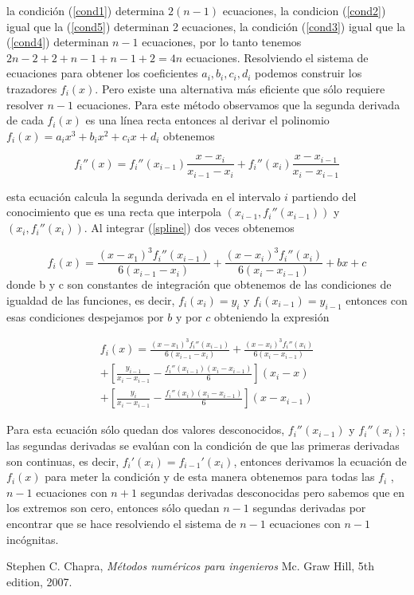 \documentclass[10pt,twocolumn]{article}
\begin{document}
la condici\'on (\ref{cond1}) determina $2(n-1)$ ecuaciones, la condicion (\ref{cond2}) igual que la (\ref{cond5}) determinan 2 ecuaciones, la 
condici\'on
(\ref{cond3}) igual que la 
(\ref{cond4}) determinan $n-1$ ecuaciones, por lo tanto tenemos $2n-2 + 2 + n-1 + n-1 + 2 = 4n$ ecuaciones. Resolviendo el sistema de ecuaciones para 
obtener los coeficientes $a_i,b_i,c_i,d_i$ podemos construir los trazadores $f_i(x)$. Pero existe una alternativa m\'as eficiente que s\'olo requiere 
resolver $n-1$ ecuaciones. Para este m\'etodo observamos que la segunda derivada de cada $f_i(x)$ es una l\'inea recta entonces al derivar el polinomio
$f_i(x)=a_ix^3 + b_ix^2 + c_ix + d_i$ obtenemos 

\begin{equation}
	f_i''(x)=f_i''(x_{i-1})\frac{x-x_i}{x_{i-1}-x_i} + f_i''(x_i)\frac{x-x_{i-1}}{x_i-x_{i-1}}
	\label{spline}
\end{equation}

esta ecuaci\'on calcula la segunda derivada en el intervalo $i$ partiendo del conocimiento que es una recta que interpola $(x_{i-1},f_i''(x_{i-1}))$ y 
$(x_i,f_i''(x_i))$. Al integrar (\ref{spline}) dos veces obtenemos 

\begin{equation}
	f_i(x)=\frac{(x-x_1)^3f_i''(x_{i-1})}{6(x_{i-1}-x_i)}+\frac{(x-x_i)^3f_i''(x_i)}{6(x_i-x_{i-1})}+bx+c
	\label{int}
\end{equation}
 donde b y c son constantes de integraci\'on que obtenemos de las condiciones de igualdad de las funciones, es decir, $f_i(x_i)=y_i$ y 
$f_i(x_{i-1})=y_{i-1}$ entonces con esas condiciones despejamos por $b$ y por $c$ obteniendo la expresi\'on 

\begin{multline}
	f_i(x)=\frac{(x-x_1)^3f_i''(x_{i-1})}{6(x_{i-1}-x_i)}+\frac{(x-x_i)^3f_i''(x_i)}{6(x_i-x_{i-1})} \\
	+[\frac{y_{i-1}}{x_i-x_{i-1}} - \frac{f_i''(x_{i-1})(x_i-x_{i-1})}{6}](x_i-x) \\
	+[\frac{y_i}{x_i-x_{i-1}}-\frac{f_i''(x_i)(x_i-x_{i-1})}{6}](x-x_{i-1})
\end{multline}

Para esta ecuaci\'on s\'olo quedan dos valores desconocidos, $f_i''(x_{i-1})$ y $f_i''(x_i)$; las segundas derivadas se eval\'uan con la condici\'on de 
que las primeras derivadas son continuas, es decir, $f_i'(x_i)=f_{i-1}'(x_i)$, entonces derivamos la ecuaci\'on de $f_i(x)$ para meter la condici\'on y 
de 
esta manera 
obtenemos para todas las $f_i$ , $n-1$ ecuaciones con $n+1$ segundas derivadas desconocidas pero sabemos que en los extremos son cero, entonces sólo 
quedan $n-1$ segundas derivadas por encontrar que se hace resolviendo el sistema de $n-1$ ecuaciones con $n-1$ inc\'ognitas.

\begin{thebibliography}{9}
	Stephen C. Chapra,
	\emph{M\'etodos num\'ericos para ingenieros}
	Mc. Graw Hill, 5th edition, 2007.
\end{thebibliography}
\end{document}
